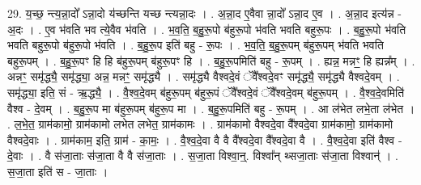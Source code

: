 \documentclass[17pt]{extarticle}
\begin{document}
29. य॒च्छ॒ न्त्य॒न्ना॒दो᳚ ऽन्ना॒दो य॑च्छन्ति यच्छ न्त्यन्ना॒दः । . अ॒न्ना॒द ए॒वैवा न्ना॒दो᳚ ऽन्ना॒द ए॒व । . अ॒न्ना॒द इत्य॑न्न - अ॒दः । . ए॒व भ॑वति भव त्ये॒वैव भ॑वति । . भ॒व॒ति॒ ब॒हु॒रू॒पो ब॑हुरू॒पो भ॑वति भवति बहुरू॒पः । . ब॒हु॒रू॒पो भ॑वति भवति बहुरू॒पो ब॑हुरू॒पो भ॑वति । . ब॒हु॒रू॒प इति॑ बहु - रू॒पः । . भ॒व॒ति॒ ब॒हु॒रू॒पम् ब॑हुरू॒पम् भ॑वति भवति बहुरू॒पम् । . ब॒हु॒रू॒पꣳ हि हि ब॑हुरू॒पम् ब॑हुरू॒पꣳ हि । . ब॒हु॒रू॒पमिति॑ बहु - रू॒पम् । . ह्यन्न॒ मन्नꣳ॒॒ हि ह्यन्न᳚म् । . अन्नꣳ॒॒ समृ॑द्ध्यै॒ समृ॑द्ध्या॒ अन्न॒ मन्नꣳ॒॒ समृ॑द्ध्यै । . समृ॑द्ध्यै वैश्वदे॒वं ॅवै᳚श्वदे॒वꣳ समृ॑द्ध्यै॒ समृ॑द्ध्यै वैश्वदे॒वम् । . समृ॑द्ध्या॒ इति॒ सं - ऋ॒द्ध्यै॒ । . वै॒श्व॒दे॒वम् ब॑हुरू॒पम् ब॑हुरू॒पं ॅवै᳚श्वदे॒वं ॅवै᳚श्वदे॒वम् ब॑हुरू॒पम् । . वै॒श्व॒दे॒वमिति॑ वैश्व - दे॒वम् । . ब॒हु॒रू॒प मा ब॑हुरू॒पम् ब॑हुरू॒प मा । . ब॒हु॒रू॒पमिति॑ बहु - रू॒पम् । . आ ल॑भेत लभे॒ता ल॑भेत । . ल॒भे॒त॒ ग्राम॑कामो॒ ग्राम॑कामो लभेत लभेत॒ ग्राम॑कामः । . ग्राम॑कामो वैश्वदे॒वा वै᳚श्वदे॒वा ग्राम॑कामो॒ ग्राम॑कामो वैश्वदे॒वाः । . ग्राम॑काम॒ इति॒ ग्राम॑ - का॒मः॒ । . वै॒श्व॒दे॒वा वै वै वै᳚श्वदे॒वा वै᳚श्वदे॒वा वै । . वै॒श्व॒दे॒वा इति॑ वैश्व - दे॒वाः । . वै स॑जा॒ताः स॑जा॒ता वै वै स॑जा॒ताः । . स॒जा॒ता विश्वा॒न्॒. विश्वा᳚न् थ्सजा॒ताः स॑जा॒ता विश्वान्॑ । . स॒जा॒ता इति॑ स - जा॒ताः । \newline
\end{document}
